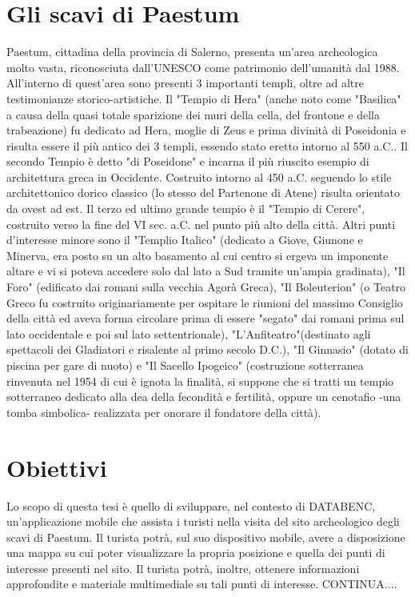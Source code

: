 \section{Gli scavi di Paestum}
Paestum, cittadina della provincia di Salerno, presenta un'area archeologica molto vasta, riconosciuta dall'UNESCO come patrimonio dell'umanità dal 1988.
All'interno di quest'area sono presenti 3 importanti templi, oltre ad altre testimonianze storico-artistiche. Il "Tempio di Hera" (anche noto come "Basilica" a causa della quasi totale sparizione dei muri della cella, del frontone e della trabeazione) fu dedicato ad Hera, moglie di Zeus e prima divinità di Poseidonia e risulta essere il più antico dei 3 templi, essendo stato eretto intorno al 550 a.C.. 
Il secondo Tempio è detto "di Poseidone" e incarna il più riuscito esempio di architettura greca in Occidente. Costruito intorno al 450 a.C. seguendo lo stile architettonico dorico classico (lo stesso del Partenone di Atene) risulta orientato da ovest ad est. Il terzo ed ultimo grande tempio è il "Tempio di Cerere", costruito verso la fine del VI sec. a.C. nel punto più alto della città. Altri punti d'interesse minore sono il "Templio Italico" (dedicato a Giove, Giunone e Minerva, era posto su un alto basamento al cui centro si ergeva un imponente altare e vi si poteva accedere solo dal lato a Sud tramite un'ampia gradinata), "Il Foro" (edificato dai romani sulla vecchia Agorà Greca), "Il Boleuterion" (o Teatro Greco fu costruito originariamente per ospitare le riunioni del massimo Consiglio della città ed aveva forma circolare prima di essere "segato" dai romani prima sul lato occidentale e poi sul lato settentrionale), "L'Anfiteatro"(destinato agli spettacoli dei Gladiatori e risalente al primo secolo D.C.), "Il Ginnasio" (dotato di piscina per gare di nuoto) e "Il Sacello Ipogeico" (costruzione sotterranea rinvenuta nel 1954 di cui è ignota la finalità, si suppone che si tratti un tempio sotterraneo dedicato alla dea della fecondità e fertilità, oppure un cenotafio -una tomba simbolica- realizzata per onorare il fondatore della città).
\section{Obiettivi}
Lo scopo di questa tesi è quello di sviluppare, nel contesto di DATABENC, un'applicazione mobile che assista i turisti nella visita del sito archeologico degli scavi di Paestum.
Il turista potrà, sul suo dispositivo mobile, avere a disposizione una mappa su cui poter visualizzare la propria posizione e quella dei punti di interesse presenti nel sito.
Il turista potrà, inoltre, ottenere informazioni approfondite e materiale multimediale su tali punti di interesse. 
CONTINUA....





\clearpage{\pagestyle{empty}\cleardoublepage}

